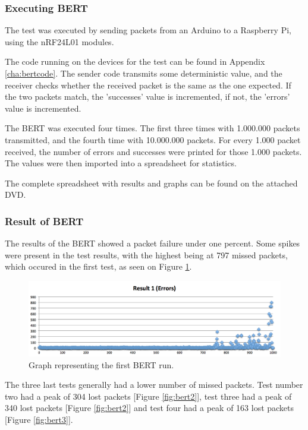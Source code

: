 \subsubsection*{Executing BERT} 
The test was executed by sending packets from an Arduino to a Raspberry Pi, using the nRF24L01 modules.

The code running on the devices for the test can be found in Appendix \ref{cha:bertcode}.
The sender code transmits some deterministic value, and the receiver checks whether the received packet is the same as the one expected. If the two packets match, the 'successes' value is incremented, if not, the 'errors' value is incremented.

The BERT was executed four times. The first three times with 1.000.000 packets transmitted, and the fourth time with 10.000.000 packets. For every 1.000 packet received, the number of errors and successes were printed for those 1.000 packets. 
The values were then imported into a spreadsheet for statistics.

The complete spreadsheet with results and graphs can be found on the attached DVD. 

\subsubsection*{Result of BERT}
The results of the BERT showed a packet failure under one percent. Some spikes were present in the test results, with the highest being at 797 missed packets, which occured in the first test, as seen on Figure \ref{fig:bert1}.

\begin{figure}[h!]
\hspace*{-2cm}
\includegraphics[width=1.3\textwidth]{chapters/test/figures/res1.png}
\caption{Graph representing the first BERT run.}
\label{fig:bert1}
\end{figure}

The three last tests generally had a lower number of missed packets. Test number two had a peak of 304 lost packets [Figure \ref{fig:bert2}], test three had a peak of 340 lost packets [Figure \ref{fig:bert2}] and test four had a peak of 163 lost packets [Figure \ref{fig:bert3}].

